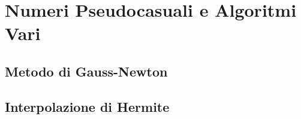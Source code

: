 \chapter{Numeri Pseudocasuali e Algoritmi Vari}\label{appendixC}
\section{Metodo di Gauss-Newton}\label{appendixC:gaussNewton}
\section{Interpolazione di Hermite}\label{appendixC:hermiteInterp}
